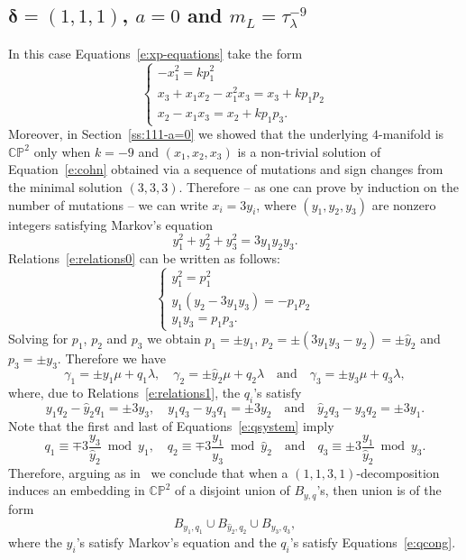 \documentclass[11pt,a4paper]{amsart}
\newcommand{\CP}{\mathbb{CP}}
\newcommand{\de}{\delta}
\newcommand{\ga}{\gamma}
\newcommand{\la}{\lambda}
\newcommand{\bde}{\bm{\de}}
\theoremstyle{definition}
\numberwithin{equation}{section}
\begin{document}
\subsection{$\bde=(1,1,1)$, $a=0$ and $m_L=\tau_\la^{-9}$}\label{ss:pairs=111-a=0}
In this case Equations~\eqref{e:xp-equations} 
take the form 
\begin{equation}\label{e:relations0}
\begin{cases}
-x_1^2 = k p_1^2 \\
x_3 + x_1 x_2 - x_1^2 x_3 = x_3 + k p_1 p_2\\
x_2 - x_1 x_3 = x_2 + k p_1 p_3.
\end{cases}
\end{equation}
Moreover, in Section~\ref{ss:111-a=0} we showed that the underlying $4$-manifold is $\CP^2$ 
only when $k=-9$ and $(x_1,x_2,x_3)$ is a non-trivial solution of Equation~\eqref{e:cohn} 
obtained via a sequence of mutations and sign changes from the minimal solution $(3,3,3)$. 
Therefore -- as one can prove by induction on the number of mutations -- we can write $x_i=3y_i$, 
where $(y_1,y_2,y_3)$ are nonzero integers satisfying Markov's equation
\[
y_1^2+y_2^2+y_3^2 = 3 y_1 y_2 y_3.
\]
Relations~\eqref{e:relations0} can be written as follows:  
\begin{equation}\label{e:relations2}
\begin{cases}
y_1^2 = p_1^2 \\
y_1 (y_2 - 3 y_1 y_3) = - p_1 p_2\\
y_1 y_3 = p_1 p_3.
\end{cases}
\end{equation}
Solving for $p_1$, $p_2$ and $p_3$ we obtain 
$p_1 = \pm y_1$, $p_2 = \pm (3y_1 y_3 - y_2) = \pm \hat y_2 $ and $p_3 = \pm y_3$.  
Therefore we have 
\[
\ga_1 = \pm y_1\mu + q_1\la,\quad 
\ga_2 = \pm \hat y_2\mu + q_2\la\quad\text{and}\quad
\ga_3 = \pm y_3\mu + q_3\la,  
\]
where, due to Relations~\eqref{e:relations1}, the $q_i$'s satisfy 
\begin{equation}\label{e:qsystem}
y_1 q_2 - \hat y_2 q_1 = \pm 3y_3,\quad 
y_1 q_3 - y_3 q_1 = \pm 3y_2\quad\text{and}\quad 
\hat y_2 q_3 - y_3 q_2 = \pm 3y_1.
\end{equation} 
Note that the first and last of Equations~\eqref{e:qsystem} imply 
\begin{equation}\label{e:qcong}
q_1 \equiv \mp 3\frac{y_3}{\hat y_2}\bmod y_1,\quad 
q_2 \equiv \mp 3\frac{y_1}{y_3}\bmod\hat y_2\quad\text{and}\quad 
q_3 \equiv \pm 3\frac{y_1}{\hat y_2}\bmod y_3.
\end{equation}
Therefore, arguing as in~\cite[Proposition~3.2 and Lemma~5.1]{LP22-2} we conclude that when a $(1,1,3,1)$-decomposition induces an embedding in $\CP^2$ of a  disjoint union of $B_{y,q}$'s, then union is of the form 
\begin{equation}\label{e:tripleofballs-111}
B_{y_1,q_1}\cup B_{\hat y_2,q_2}\cup B_{y_3,q_3},
\end{equation}
where the $y_i$'s satisfy Markov's equation and the $q_i$'s satisfy Equations~\eqref{e:qcong}.
\end{document}
